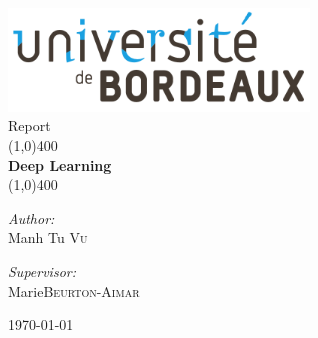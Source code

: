 \documentclass[11pt]{article}
\begin{document}
\begin{titlepage}
	\begin{center}
\includegraphics[width=0.6\textwidth]{images/bordeaux.png}\\[1cm]


{\large Report}\\[0.5cm]	
	
	\line(1,0){400}\\[0.2in]
	\huge{\bfseries Deep Learning}\\
	\line(1,0){400}\\[1.5cm]
	
	\noindent	
	
	\begin{minipage}[t]{0.4\textwidth}
		\begin{flushleft} \large
    	\emph{Author:}\\%
    	Manh Tu \textsc{Vu}
		\end{flushleft}
	\end{minipage}
	\begin{minipage}[t]{0.4\textwidth}
  		\begin{flushright} \large
    		\emph{Supervisor:} \\
    		Marie\textsc{Beurton-Aimar}
  		\end{flushright}
	\end{minipage}
	
	\vfill

{\large \today}
	\end{center}
\end{titlepage}


\tableofcontents
\thispagestyle{empty}
\clearpage

\end{document}
